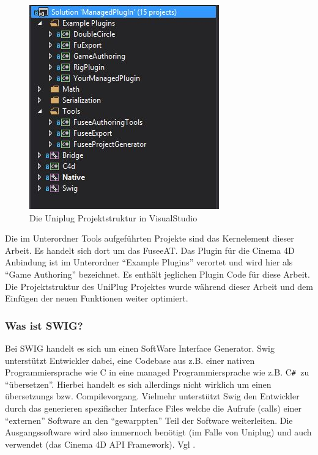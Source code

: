 \documentclass[pagesize, paper=a4, fontsize=12pt, titlepage=true, headings=small, headnosepline, abstractoff, liststotoc, nochapterprefix, plainheadsepline, twoside]{scrreprt}
\newcommand{\CSS}{C\texttt{\# }}
\newcommand{\CPPS}{C\nolinebreak\hspace{-.05em}\raisebox{.4ex}{\tiny\bf +}\nolinebreak\hspace{-.10em}\raisebox{.4ex}{\tiny\bf +} }
\begin{document}
\begin{figure}[ht]
	\centering
  \includegraphics[width=\linewidth / 2]{Bilder/UniplugVSStruktur.JPG}
	\caption{Die Uniplug Projektstruktur in VisualStudio}
	\label{UniPlugVSStruktur}
\end{figure}
Die im Unterordner Tools aufgeführten Projekte sind das Kernelement dieser Arbeit. Es handelt sich dort um das FuseeAT. Das Plugin für die Cinema 4D Anbindung ist im Unterordner “Example Plugins” verortet und wird hier als “Game Authoring” bezeichnet. Es enthält jeglichen Plugin Code für diese Arbeit. Die Projektstruktur des UniPlug Projektes wurde während dieser Arbeit und dem Einfügen der neuen Funktionen weiter optimiert.

\subsubsection{Was ist SWIG?}
Bei SWIG handelt es sich um einen SoftWare Interface Generator. Swig unterstützt Entwickler dabei, eine Codebase aus z.B. einer nativen Programmiersprache wie \CPPS in eine managed Programmiersprache wie z.B. \CSS zu “übersetzen”. Hierbei handelt es sich allerdings nicht wirklich um einen übersetzungs bzw. Compilevorgang. Vielmehr unterstützt Swig den Entwickler durch das generieren spezifischer Interface Files welche die Aufrufe (calls) einer “externen” Software an den “gewarppten” Teil der Software weiterleiten. Die Ausgangssoftware wird also immernoch benötigt (im Falle von Uniplug) und auch verwendet (das Cinema 4D API Framework). Vgl .
\end{document}
